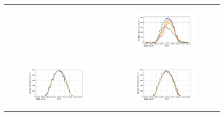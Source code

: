 \begin{figure}[hbtp]
\begin{tabular}{cc}
\begin{subfigure}[t]{0.5\textwidth}
        \end{subfigure} &
        \begin{subfigure}[t]{0.5\textwidth}
            \caption{}
            \includegraphics[width=\textwidth]{images/chap6/IOP_TS/TS_2021-07-20_elsplans_sens.png}
        \end{subfigure} \\
        \begin{subfigure}[t]{0.5\textwidth}
            \caption{}
            \includegraphics[width=\textwidth]{images/chap6/IOP_TS/TS_2021-07-15_elsplans_SWdnSFC.png}
        \end{subfigure} &
        \begin{subfigure}[t]{0.5\textwidth}
            \caption{}
            \includegraphics[width=\textwidth]{images/chap6/IOP_TS/TS_2021-07-20_elsplans_SWdnSFC.png}

\end{subfigure}
\end{tabular}
\end{figure}
